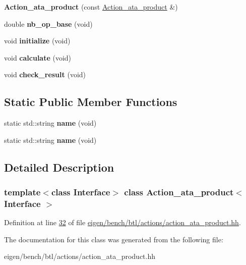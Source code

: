 \begin{DoxyCompactItemize}
{\bfseries Action\+\_\+ata\+\_\+product} (const \hyperlink{class_action__ata__product}{Action\+\_\+ata\+\_\+product} \&)
\item 
\mbox{\label{class_action__ata__product_a63f70df6346f567e1015180b0282ff5c}} 
double {\bfseries nb\+\_\+op\+\_\+base} (void)
\item 
\mbox{\label{class_action__ata__product_aaac67c03f0421329ff311ebd1cca9dd9}} 
void {\bfseries initialize} (void)
\item 
\mbox{\label{class_action__ata__product_a15573d7fc39e087347d3cdf998e75f0c}} 
void {\bfseries calculate} (void)
\item 
\mbox{\label{class_action__ata__product_acf0798c064452e0336a690c1ef09b6dd}} 
void {\bfseries check\+\_\+result} (void)
\end{DoxyCompactItemize}
\subsection*{Static Public Member Functions}
\begin{DoxyCompactItemize}
\item 
\mbox{\label{class_action__ata__product_a89eb14f5534b688f4a9454899abc86d1}} 
static std\+::string {\bfseries name} (void)
\item 
\mbox{\label{class_action__ata__product_a89eb14f5534b688f4a9454899abc86d1}} 
static std\+::string {\bfseries name} (void)
\end{DoxyCompactItemize}


\subsection{Detailed Description}
\subsubsection*{template$<$class Interface$>$\newline
class Action\+\_\+ata\+\_\+product$<$ Interface $>$}



Definition at line \hyperlink{eigen_2bench_2btl_2actions_2action__ata__product_8hh_source_l00032}{32} of file \hyperlink{eigen_2bench_2btl_2actions_2action__ata__product_8hh_source}{eigen/bench/btl/actions/action\+\_\+ata\+\_\+product.\+hh}.



The documentation for this class was generated from the following file\+:\begin{DoxyCompactItemize}
\item 
eigen/bench/btl/actions/action\+\_\+ata\+\_\+product.\+hh\end{DoxyCompactItemize}

